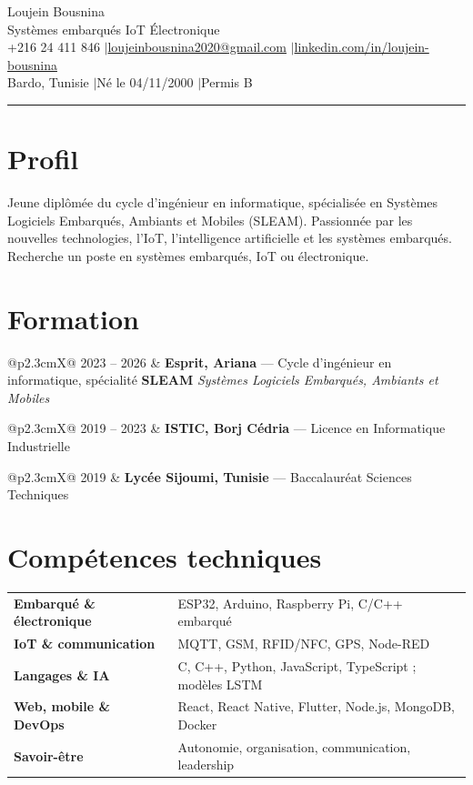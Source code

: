\documentclass[10pt,a4paper]{article}
\makeatletter
\newcommand{\cvrow}[4]{%
  \noindent\begin{tabularx}{\linewidth}{@{}p{2.3cm}X@{}}
    \small #1 & \textbf{#2} --- #3 \hfill\textit{\small #4}\\
  \end{tabularx}\par\vspace{3pt}%
}
\makeatother
\begin{document}
\begin{center}
  {\LARGE Loujein Bousnina}\\[3pt]
  {\large Systèmes embarqués \textbullet{} IoT \textbullet{} Électronique}\\[4pt]
  {\small +216 24 411 846
    \quad$|$\quad \href{mailto:loujeinbousnina2020@gmail.com}{loujeinbousnina2020@gmail.com}
    \quad$|$\quad \href{https://www.linkedin.com/in/loujein-bousnina/}{linkedin.com/in/loujein-bousnina}}\\[1pt]
  {\small Bardo, Tunisie \quad$|$\quad Né le 04/11/2000 \quad$|$\quad Permis B}
\end{center}
\vspace{3pt}
\hrule
\vspace{2pt}

\section{Profil}
{\small
Jeune diplômée du cycle d'ingénieur en informatique, spécialisée en Systèmes Logiciels Embarqués, Ambiants
et Mobiles (SLEAM). Passionnée par les nouvelles technologies, l'IoT, l'intelligence artificielle et les systèmes
embarqués. Recherche un poste en systèmes embarqués, IoT ou électronique.
\par}

\section{Formation}
\cvrow{2023 -- 2026}{Esprit, Ariana}{Cycle d'ingénieur en informatique, spécialité \textbf{SLEAM}\newline
  \textit{\small Systèmes Logiciels Embarqués, Ambiants et Mobiles}}{}
\cvrow{2019 -- 2023}{ISTIC, Borj Cédria}{Licence en Informatique Industrielle}{}
\cvrow{2019}{Lycée Sijoumi, Tunisie}{Baccalauréat Sciences Techniques}{}

\section{Compétences techniques}
\noindent\begin{tabularx}{\linewidth}{@{}>{\bfseries}p{5.2cm}X@{}}
  Embarqué \& électronique    & \small ESP32, Arduino, Raspberry Pi, C/C++ embarqué \\[2pt]
  IoT \& communication        & \small MQTT, GSM, RFID/NFC, GPS, Node-RED \\[2pt]
  Langages \& IA              & \small C, C++, Python, JavaScript, TypeScript ; modèles LSTM \\[2pt]
  Web, mobile \& DevOps       & \small React, React Native, Flutter, Node.js, MongoDB, Docker \\[2pt]
  Savoir-être                 & \small Autonomie, organisation, communication, leadership \\
\end{tabularx}
\end{document}
